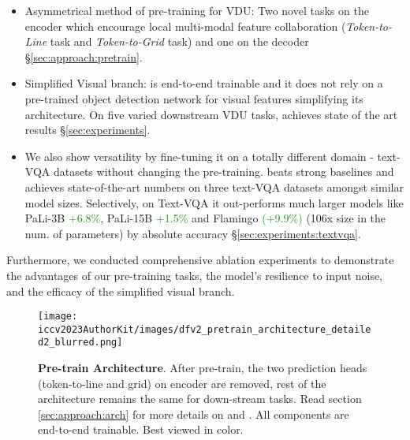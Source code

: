 \documentclass[10pt,twocolumn,letterpaper]{article}
\begin{document}
\begin{itemize}[leftmargin=*]
	\item Asymmetrical method of pre-training for VDU: Two novel tasks on the encoder which encourage local multi-modal feature collaboration (\textit{Token-to-Line} task and \textit{Token-to-Grid} task) and one on the decoder \S \ref{sec:approach:pretrain}. \item Simplified Visual branch: \papertitle is end-to-end trainable and it does not rely on a pre-trained object detection network for visual features simplifying its architecture. On five varied downstream VDU tasks, \papertitle achieves state of the art results \S \ref{sec:experiments}. 
	\item We also show \papertitle versatility by fine-tuning it on a totally different domain - text-VQA datasets without changing the pre-training. \papertitle beats strong baselines and achieves state-of-the-art numbers on three text-VQA datasets amongst similar model sizes. Selectively, on Text-VQA it out-performs much larger models like PaLi-3B \textcolor{forestgreen}{+6.8\%}, PaLi-15B \textcolor{forestgreen}{+1.5\%} and Flamingo\cite{Alayrac2022FlamingoAV} \textcolor{forestgreen}{(+9.9\%)} (106x \papertitle size in the num. of parameters) by  absolute accuracy \S \ref{sec:experiments:textvqa}. 
\end{itemize}

\noindent Furthermore, we conducted comprehensive ablation experiments to demonstrate the advantages of our pre-training tasks, the model's resilience to input noise, and the efficacy of the simplified visual branch.


\begin{figure*}[t]
  \centering
  \texttt{[image: iccv2023AuthorKit/images/dfv2\_pretrain\_architecture\_detailed2\_blurred.png]}
  \caption{\textbf{\papertitle  Pre-train Architecture}. After pre-train, the two prediction heads (token-to-line and grid) on encoder are removed, rest of the architecture remains the same for down-stream tasks. Read section \ref{sec:approach:arch} for more details on  and . All components are end-to-end trainable. Best viewed in color. }
  \label{fig:docformerv2_pretrain_architecture}
\end{figure*}
\end{document}
